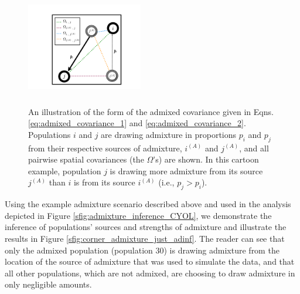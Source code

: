 \documentclass[12pt]{article}
\begin{document}
\begin{figure}[ht!]
	\centering
	\includegraphics[width=2in,height=2in]{figs/admix_cov_fig.pdf}
	\caption{An illustration of the form of the admixed covariance given in Eqns. \ref{eq:admixed_covariance_1} and \ref{eq:admixed_covariance_2}.  Populations $i$ and $j$ are drawing admixture in proportions $p_i$ and $p_j$ from their respective sources of admixture, $i^{(A)}$ and $j^{(A)}$, and all pairwise spatial covariances (the $\Omega$'s) are shown.  In this cartoon example, population $j$ is drawing more admixture from its source $j^{(A)}$ than $i$ is from its source $i^{(A)}$ (i.e., $p_j > p_i$).}\label{sfig:admixed_cov_diagram}
\end{figure}



Using the example admixture scenario described above and used in the analysis depicted in Figure \ref{sfig:admixture_inference_CYOL}, we demonstrate the inference of populations' sources and strengths of admixture and illustrate the results in Figure \ref{sfig:corner_admixture_just_adinf}.  The reader can see that only the admixed population (population 30) is drawing admixture from the location of the source of admixture that was used to simulate the data, and that all other populations, which are not admixed, are choosing to draw admixture in only negligible amounts.
\end{document}
